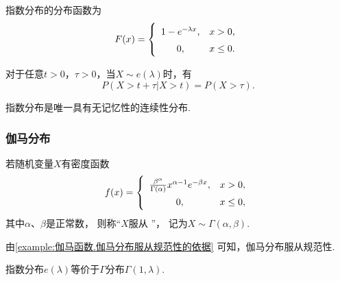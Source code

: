 \begin{theorem}
指数分布的分布函数为\begin{equation}
	F(x) = \left\{ \def\arraystretch{1.5}
	\begin{array}{cl}
		1 - e^{-\lambda x}, & x > 0, \\
		0, & x \leq 0. \\
	\end{array} \right.
\end{equation}
\end{theorem}

\begin{theorem}[指数分布的无记忆性]
对于任意\(t > 0\)，\(\tau > 0\)，当\(X \sim e(\lambda)\)时，有\[
	P(X > t + \tau \vert X > t) = P(X > \tau).
\]
\end{theorem}
\begin{remark}
指数分布是唯一具有无记忆性的连续性分布.
\end{remark}

\subsubsection{伽马分布}
\begin{definition}
若随机变量\(X\)有密度函数\begin{equation}
	f(x) = \left\{ \def\arraystretch{1.5} \begin{array}{cl}
		\frac{\beta^\alpha}{\Gamma(\alpha)} x^{\alpha-1} e^{-\beta x},
			& x > 0, \\
		0, & x \leq 0, \\
	\end{array} \right.
\end{equation}
其中\(\alpha\)、\(\beta\)是正常数，
则称“\(X\)服从 ”，
记为\(X \sim \Gamma(\alpha,\beta)\).
\end{definition}

由\cref{example:伽马函数.伽马分布服从规范性的依据} 可知，伽马分布服从规范性.

指数分布\(e(\lambda)\)等价于\(\Gamma\)分布\(\Gamma(1,\lambda)\).

